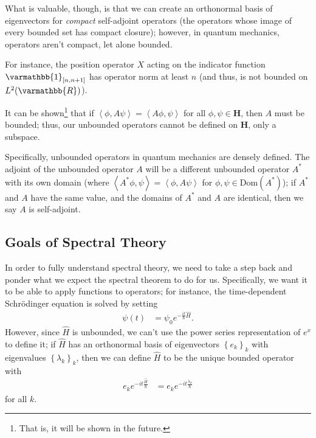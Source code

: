 \documentclass[12pt]{extarticle}
\newcommand{\R}{\varmathbb{R}}
\newcommand{\set}[1]{\left\{#1\right\}}
\newcommand{\iprod}[2]{\left\langle #1,#2\right\rangle}
\theoremstyle{plain}
\theoremstyle{definition}
\theoremstyle{remark}
\renewcommand{\newline}{\hfill\break}
\begin{document}
  What is valuable, though, is that we can create an orthonormal basis of eigenvectors for \textit{compact} self-adjoint operators (the operators whose image of every bounded set has compact closure); however, in quantum mechanics, operators aren't compact, let alone bounded.\newline

  For instance, the position operator $X$ acting on the indicator function $\varmathbb{1}_{[n,n+1]}$ has operator norm at least $n$ (and thus, is not bounded on $L^{2}(\R)$).\newline

  It can be shown\footnote{That is, it will be shown in the future.} that if $\iprod{\phi}{A\psi} = \iprod{A\phi}{\psi}$ for all $\phi,\psi \in \mathbf{H}$, then $A$ must be bounded; thus, our unbounded operators cannot be defined on $\mathbf{H}$, only a subspace.\newline

  Specifically, unbounded operators in quantum mechanics are densely defined. The adjoint of the unbounded operator $A$ will be a different unbounded operator $A^{\ast}$ with its own domain (where $\iprod{A^{\ast}\phi}{\psi} = \iprod{\phi}{A\psi}$ for $\phi,\psi \in \text{Dom}(A^{\ast})$); if $A^{\ast}$ and $A$ have the same value, and the domains of $A^{\ast}$ and $A$ are identical, then we say $A$ is self-adjoint.
  \subsection{Goals of Spectral Theory}%
  In order to fully understand spectral theory, we need to take a step back and ponder what we expect the spectral theorem to do for us. Specifically, we want it to be able to apply functions to operators; for instance, the time-dependent Schrödinger equation is solved by setting
  \begin{align*}
    \psi(t) &= \psi_0e^{-\frac{it}{\hbar}\hat{H}}.
  \end{align*}
  However, since $\hat{H}$ is unbounded, we can't use the power series representation of $e^{x}$ to define it; if $\hat{H}$ has an orthonormal basis of eigenvectors $\set{e_k}_{k}$ with eigenvalues $\set{\lambda_k}_k$, then we can define $\hat{H}$ to be the unique bounded operator with
  \begin{align*}
    e_ke^{-it\frac{\hat{H}}{\hbar}} &= e_ke^{-it\frac{\lambda_k}{\hbar}}
  \end{align*}
  for all $k$.\newline
\end{document}
